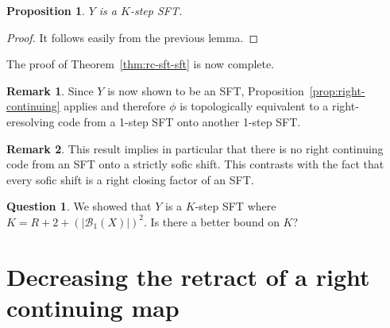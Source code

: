 \documentclass[a4paper]{amsart}
\newtheorem{proposition}[thm]{Proposition}
\theoremstyle{definition}
\newtheorem{remark}{Remark}[section]
\numberwithin{equation}{section}
\numberwithin{figure}{section}
\newtheorem{question}[thm]{Question}
\theoremstyle{definition}
\theoremstyle{remark}
\begin{document}
\begin{proposition}
  $Y$ is a $K$-step SFT.
\end{proposition}
\begin{proof}
  It follows easily from the previous lemma.
\end{proof}

The proof of Theorem~\ref{thm:rc-sft-sft} is now complete. 

\begin{remark}
  Since $Y$ is now shown to be an SFT, Proposition~\ref{prop:right-continuing} applies and therefore $\phi$ is topologically equivalent to a right-eresolving code from a 1-step SFT onto another 1-step SFT.
\end{remark}

\begin{remark}
  This result implies  in particular that there is no right continuing
  code from an SFT onto a strictly sofic shift. This contrasts with
  the fact that every sofic shift is a right closing factor of an SFT.
\end{remark}

\begin{question}
  We showed that $Y$ is a $K$-step SFT where $K = R+2+(|{\mathcal B}_1(X)|)^2$. Is there a better bound on $K$?
\end{question}

\section{Decreasing the retract of a right continuing map}
\end{document}
